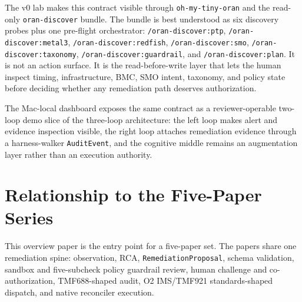 \documentclass[twocolumn,10pt,a4paper]{article}
\begin{document}
The v0 lab makes this contract visible through \texttt{oh-my-tiny-oran} and the read-only \texttt{oran-discover} bundle. The bundle is best understood as six discovery probes plus one pre-flight orchestrator: \texttt{/oran-discover:ptp}, \texttt{/oran-discover:metal3}, \texttt{/oran-discover:redfish}, \texttt{/oran-discover:smo}, \texttt{/oran-discover:taxonomy}, \texttt{/oran-discover:guardrail}, and \texttt{/oran-discover:plan}. It is not an action surface. It is the read-before-write layer that lets the human inspect timing, infrastructure, BMC, SMO intent, taxonomy, and policy state before deciding whether any remediation path deserves authorization.

The Mac-local dashboard exposes the same contract as a reviewer-operable two-loop demo slice of the three-loop architecture: the left loop makes alert and evidence inspection visible, the right loop attaches remediation evidence through a harness-walker \texttt{AuditEvent}, and the cognitive middle remains an augmentation layer rather than an execution authority.

\section{Relationship to the Five-Paper Series}
\label{sec:relationship}

This overview paper is the entry point for a five-paper set. The papers share one remediation spine: observation, RCA, \texttt{RemediationProposal}, schema validation, sandbox and five-subcheck policy guardrail review, human challenge and co-authorization, TMF688-shaped audit, O2 IMS/TMF921 standards-shaped dispatch, and native reconciler execution.
\end{document}
